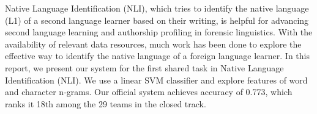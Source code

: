 Native Language Identification (NLI), which tries to identify the native language (L1) of a second language learner based on their writing, is helpful
 for advancing second language learning and authorship profiling in forensic
 linguistics. With the availability of relevant data resources, much work has
 been done to explore the effective way to identify the native language of a
 foreign language learner. In this report, we present our system for the first
 shared task in Native Language Identification (NLI). We use a linear SVM
 classifier and explore features of word and character n-grams. Our official
 system achieves accuracy of 0.773, which ranks it 18th among the 29 teams in
 the closed track.

